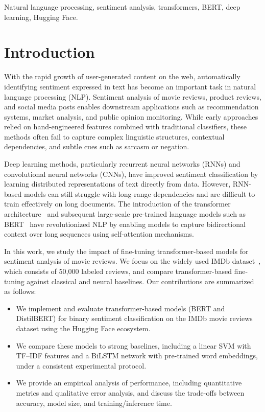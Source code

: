 \documentclass[conference]{IEEEtran}
\begin{document}
\begin{IEEEkeywords}
Natural language processing, sentiment analysis, transformers, BERT, deep learning, Hugging Face.
\end{IEEEkeywords}

\section{Introduction}
With the rapid growth of user-generated content on the web, automatically identifying sentiment expressed in text has become an important task in natural language processing (NLP). Sentiment analysis of movie reviews, product reviews, and social media posts enables downstream applications such as recommendation systems, market analysis, and public opinion monitoring. While early approaches relied on hand-engineered features combined with traditional classifiers, these methods often fail to capture complex linguistic structures, contextual dependencies, and subtle cues such as sarcasm or negation.

Deep learning methods, particularly recurrent neural networks (RNNs) and convolutional neural networks (CNNs), have improved sentiment classification by learning distributed representations of text directly from data. However, RNN-based models can still struggle with long-range dependencies and are difficult to train effectively on long documents. The introduction of the transformer architecture~\cite{vaswani2017attention} and subsequent large-scale pre-trained language models such as BERT~\cite{devlin2019bert} have revolutionized NLP by enabling models to capture bidirectional context over long sequences using self-attention mechanisms.

In this work, we study the impact of fine-tuning transformer-based models for sentiment analysis of movie reviews. We focus on the widely used IMDb dataset~\cite{maas2011learning}, which consists of 50{,}000 labeled reviews, and compare transformer-based fine-tuning against classical and neural baselines. Our contributions are summarized as follows:
\begin{itemize}
    \item We implement and evaluate transformer-based models (BERT and DistilBERT) for binary sentiment classification on the IMDb movie reviews dataset using the Hugging Face ecosystem.
    \item We compare these models to strong baselines, including a linear SVM with TF--IDF features and a BiLSTM network with pre-trained word embeddings, under a consistent experimental protocol.
    \item We provide an empirical analysis of performance, including quantitative metrics and qualitative error analysis, and discuss the trade-offs between accuracy, model size, and training/inference time.
\end{itemize}
\end{document}
